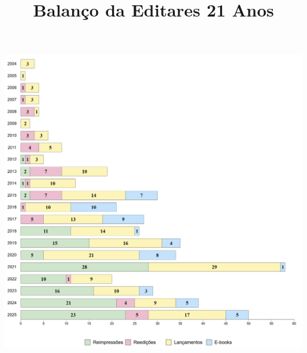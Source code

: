 \documentclass{gescons}
\title{Balanço da Editares 21 Anos}
\begin{document}
    \makeentrevistatitle


    
    
\begin{center}
    
    \includegraphics[width=\textwidth]{articles/balanco/grafico/grafico}  
\end{center}
    


\end{document}
